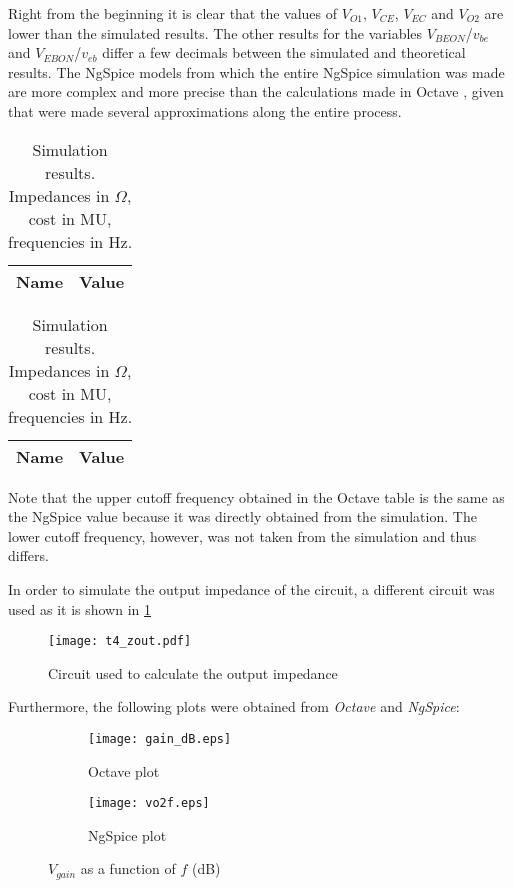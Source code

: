 Right from the beginning it is clear that the values of $V_{O1}$, $V_{CE}$, $V_{EC}$ and $V_{O2}$ are lower than the simulated results. The other results for the variables $V_{BEON}$/$v_{be}$ and $V_{EBON}$/$v_{eb}$ differ a few decimals between the simulated and theoretical results. The NgSpice \cite{bib:ngspice} models from which the entire NgSpice simulation was made are more complex and more precise than the calculations made in Octave \cite{bib:octave}, given that were made several approximations along the entire process.
\begin{table}[H]
\parbox{.5\linewidth}{
\centering                
\def\arraystretch{1}        %

\begin{tabular}{c|c}        %
\hline                      %

\textbf{Name}  & \textbf{Value}\\     
\hline                      %

\hline                      %
\end{tabular}
\captionsetup{justification=justified, margin=0.5cm} 
\caption{Theoretical results. Impedances in $\Omega$, cost in MU, frequencies in Hz.}
\label{tab9}
}
\hfill
\parbox{.5\linewidth}{
\centering
\def\arraystretch{1}

\begin{tabular}{c|c}
\hline    
\textbf{Name} & \textbf{Value} \\ \hline

\hline
\end{tabular}
\captionsetup{justification=justified, margin=0.5cm} 
\caption{Simulation results. Impedances in $\Omega$, cost in MU, frequencies in Hz.}
\label{tab10}
}
\end{table}

Note that the upper cutoff frequency obtained in the Octave table is the same as the NgSpice value because it was directly obtained from the simulation. The lower cutoff frequency, however, was not taken from the simulation and thus differs.

In order to simulate the output impedance of the circuit, a different circuit was used as it is shown in \ref{z_out}
 
\begin{figure}[H] \centering
\texttt{[image: t4\_zout.pdf]}
\caption{Circuit used to calculate the output impedance}
\label{z_out}
\end{figure}


Furthermore, the following plots were obtained from \emph{Octave} and \emph{NgSpice}:
\begin{figure}[H]
\centering
\begin{subfigure}{0.5\textwidth}
  \centering
  \texttt{[image: gain\_dB.eps]}
  \caption{Octave plot}
  \label{fig:sub1}
\end{subfigure}%
\begin{subfigure}{.5\textwidth}
  \centering
  \texttt{[image: vo2f.eps]}
  \caption{NgSpice plot}
  \label{fig:sub2}
\end{subfigure}
\caption{$V_{gain}$ as a function of $f$ (dB)}
\label{fig:test}
\end{figure}

